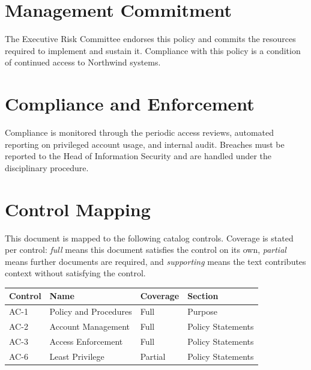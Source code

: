 \documentclass[11pt,a4paper]{article}
\begin{document}
\section{Management Commitment}
The Executive Risk Committee endorses this policy and commits the resources
required to implement and sustain it. Compliance with this policy is a condition
of continued access to Northwind systems.

\section{Compliance and Enforcement}
Compliance is monitored through the periodic access reviews, automated reporting
on privileged account usage, and internal audit. Breaches must be reported to
the Head of Information Security and are handled under the disciplinary
procedure.

\clearpage
\section{Control Mapping}
This document is mapped to the following catalog controls. Coverage is stated
per control: \emph{full} means this document satisfies the control on its own,
\emph{partial} means further documents are required, and \emph{supporting}
means the text contributes context without satisfying the control.

\vspace{0.6em}
\begin{tabularx}{\linewidth}{@{}>{\ttfamily\small}lX>{\small}l>{\small}l@{}}
  \toprule
  \sffamily\bfseries\small Control & \sffamily\bfseries\small Name &
  \sffamily\bfseries\small Coverage & \sffamily\bfseries\small Section \\
  \midrule
  AC-1 & Policy and Procedures & Full & Purpose \\
  AC-2 & Account Management & Full & Policy Statements \\
  AC-3 & Access Enforcement & Full & Policy Statements \\
  AC-6 & Least Privilege & Partial & Policy Statements \\
  \bottomrule
\end{tabularx}

\vspace{1.5em}
\end{document}
